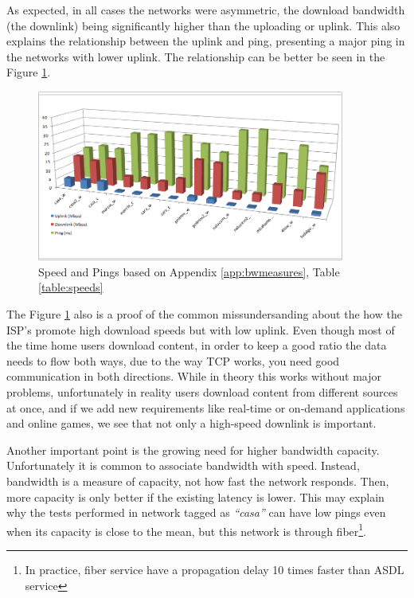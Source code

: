 As expected, in all cases the networks were asymmetric, 
the download bandwidth (the downlink) being significantly higher than the uploading
or uplink. This also explains the relationship between the uplink and ping,
presenting a major ping in the networks with lower uplink. The relationship
can be better be seen in the Figure \ref{fig:speeds}.

\begin{figure}[ht]
\centering
    \includegraphics[width=0.9\textwidth]{img/speed_graph}
\caption{Speed and Pings based on Appendix \ref{app:bwmeasures}, Table \ref{table:speeds}}
\label{fig:speeds}
\end{figure}%

The Figure \ref{fig:speeds} also is a proof of the common missundersanding
about the how the ISP's promote high download speeds but with low uplink. Even
though most of the time home users download content, in order to keep a good
ratio the data needs to flow both ways, due to the way TCP
works, you need good communication in both directions. While in theory this
works without major problems, unfortunately in reality users download content
from different sources at once, and if we add new requirements like real-time  or on-demand applications and online games, we see that not only a
high-speed downlink is important.

Another important point is the growing need for higher bandwidth capacity.
Unfortunately it is common to associate bandwidth with speed. Instead,
bandwidth is a measure of capacity, not how fast the network responds. Then,
more capacity is only better if the existing latency is lower. This may
explain why the tests performed in network tagged as \textit{``casa''} can have low pings
even when its capacity is close to the mean, but this network is through
fiber\footnote{In practice, fiber service have a propagation delay 10 times
faster than ASDL service}.

